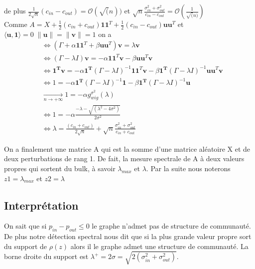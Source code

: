 de plus $\frac{1}{2\sqrt{n}}(c_{in} - c_{out}) = \mathcal{O}(\sqrt(n))$ et $\sqrt{n}\frac{\sigma_{in}^2 + \sigma_{out}^2}{c_{in} - c_{out}} =  \mathcal{O}(\frac{1}{\sqrt(n)})$\\
 
Comme $A = X + \frac{1}{2}(c_{in} + c_{out})\mathbf{11}^T + \frac{1}{2}(c_{in} - c_{out})\mathbf{uu}^T$ et $\langle\mathbf{u}, \mathbf{1}\rangle = 0 \; \|\mathbf{u}\|=\|\mathbf{v}\|=1$ on a
\begin{align}
	&\Leftrightarrow (\Gamma + \alpha\mathbf{11}^T + \beta \mathbf{uu}^T)\mathbf{v} = \lambda \mathbf{v}\nonumber\\
	&\Leftrightarrow (\Gamma - \lambda I)\mathbf{v} = -\alpha\mathbf{11}^T\mathbf{v} - \beta \mathbf{uu}^T\mathbf{v} \nonumber\\
	&\Leftrightarrow \mathbf{1^Tv} = -\alpha\mathbf{1^T} (\Gamma - \lambda I)^{-1}\mathbf{11}^T\mathbf{v} - \beta \mathbf{1^T} (\Gamma - \lambda I)^{-1}\mathbf{uu}^T\mathbf{v} \nonumber\\
	&\Leftrightarrow 1 = -\alpha\mathbf{1^T} (\Gamma - \lambda I)^{-1}\mathbf{1} - \beta \mathbf{1^T} (\Gamma - \lambda I)^{-1}\mathbf{u} \nonumber\\
	&\xrightarrow[n \to +\infty]{} 1 = -\alpha g_{wig}^{\sigma^2}(\lambda) \nonumber\\
	&\Leftrightarrow 1 = -\alpha  \frac{- \lambda - \sqrt{(\lambda^2 - 4\sigma^2)}}{2\sigma^2}\nonumber\\
	&\Leftrightarrow \lambda = \frac{(c_{in} + c_{out})}{2\sqrt{n}} + \sqrt{n}\frac{\sigma_{in}^2 + \sigma_{out}^2}{c_{in} + c_{out}} \label{z2}
\end{align} 

On a finalement une matrice A qui est la somme d'une matrice aléatoire X et de deux perturbations de rang 1.
De fait, la mesure spectrale de A à deux valeurs propres qui sortent du bulk, à savoir $\lambda_{max}$ et $\lambda$.
Par la suite nous noterons $z1 = \lambda_{max}$ et $z2 = \lambda$

\subsection{Interprétation}
\label{subsec:1.3}
On sait que si $p_{in} - p_{out} \le 0$  le graphe n'admet pas de structure de communauté.
De plus notre détection spectral nous dit que si la plus grande valeur propre sort du support de $\rho(z)$ alors il le graphe admet une structure de communauté.
La borne droite du support est $\lambda^+ = 2\sigma = \sqrt{2(\sigma_{in}^2 + \sigma_{out}^2)}$.


